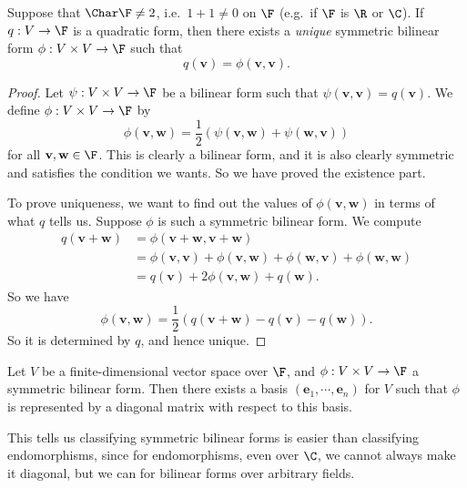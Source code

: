 \documentclass[a4paper]{article}
\begin{document}
\begin{prop}
  Suppose that $\Char \F \not= 2$, i.e.\ $1 + 1 \not= 0$ on $\F$ (e.g.\ if $\F$ is $\R$ or $\C$). If $q: V\to \F$ is a quadratic form, then there exists a \emph{unique} symmetric bilinear form $\phi: V \times V\to \F$ such that
  \[
    q(\mathbf{v}) = \phi(\mathbf{v}, \mathbf{v}).
  \]
\end{prop}

\begin{proof}
  Let $\psi: V \times V\to \F$ be a bilinear form such that $\psi(\mathbf{v}, \mathbf{v}) = q(\mathbf{v})$. We define $\phi: V \times V\to \F$ by
  \[
    \phi(\mathbf{v}, \mathbf{w}) = \frac{1}{2}(\psi(\mathbf{v}, \mathbf{w}) + \psi(\mathbf{w}, \mathbf{v}))
  \]
  for all $\mathbf{v}, \mathbf{w} \in \F$. This is clearly a bilinear form, and it is also clearly symmetric and satisfies the condition we wants. So we have proved the existence part.

  To prove uniqueness, we want to find out the values of $\phi(\mathbf{v}, \mathbf{w})$ in terms of what $q$ tells us. Suppose $\phi$ is such a symmetric bilinear form. We compute
  \begin{align*}
    q(\mathbf{v} + \mathbf{w}) &= \phi(\mathbf{v} + \mathbf{w}, \mathbf{v} + \mathbf{w}) \\
    &= \phi(\mathbf{v}, \mathbf{v}) + \phi(\mathbf{v}, \mathbf{w}) + \phi(\mathbf{w}, \mathbf{v}) + \phi(\mathbf{w}, \mathbf{w})\\
    &= q(\mathbf{v}) + 2\phi(\mathbf{v}, \mathbf{w}) + q(\mathbf{w}).
  \end{align*}
  So we have
  \[
    \phi(\mathbf{v}, \mathbf{w}) = \frac{1}{2}(q(\mathbf{v} + \mathbf{w}) - q(\mathbf{v}) - q(\mathbf{w})).
  \]
  So it is determined by $q$, and hence unique.
\end{proof}

\begin{thm}
  Let $V$ be a finite-dimensional vector space over $\F$, and $\phi: V\times V \to \F$ a symmetric bilinear form. Then there exists a basis $(\mathbf{e}_1, \cdots, \mathbf{e}_n)$ for $V$ such that $\phi$ is represented by a diagonal matrix with respect to this basis.
\end{thm}
This tells us classifying symmetric bilinear forms is easier than classifying endomorphisms, since for endomorphisms, even over $\C$, we cannot always make it diagonal, but we can for bilinear forms over arbitrary fields.
\end{document}
